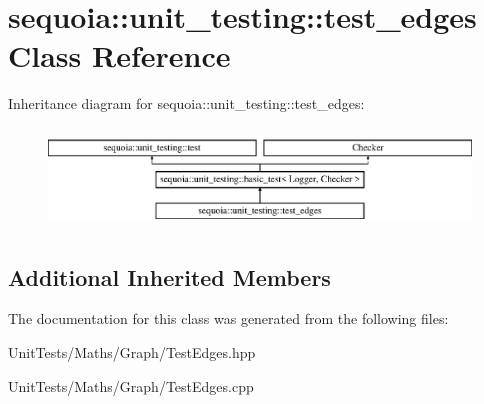 \hypertarget{classsequoia_1_1unit__testing_1_1test__edges}{}\section{sequoia\+::unit\+\_\+testing\+::test\+\_\+edges Class Reference}
\label{classsequoia_1_1unit__testing_1_1test__edges}
Inheritance diagram for sequoia\+::unit\+\_\+testing\+::test\+\_\+edges\+:\begin{figure}[H]
\begin{center}
\leavevmode
\includegraphics[height=2.666667cm]{classsequoia_1_1unit__testing_1_1test__edges}
\end{center}
\end{figure}
\subsection*{Additional Inherited Members}


The documentation for this class was generated from the following files\+:\begin{DoxyCompactItemize}
\item 
Unit\+Tests/\+Maths/\+Graph/Test\+Edges.\+hpp\item 
Unit\+Tests/\+Maths/\+Graph/Test\+Edges.\+cpp\end{DoxyCompactItemize}
